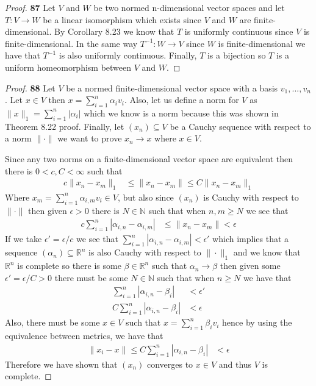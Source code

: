 \documentclass[11pt]{article}
\newcommand{\N}{\mathbb{N}}
\newcommand{\R}{\mathbb{R}}
\theoremstyle{definition}
\begin{document}
    \cleardoublepage
    \begin{proof}{\textbf{87}}
        Let $V$ and $W$ be two normed n-dimensional vector spaces and let
        $T:V \to W$ be a linear isomorphism which exists since $V$ and $W$
        are finite-dimensional. By Corollary 8.23 we know that
        $T$ is uniformly continuous since $V$ is finite-dimensional.
        In the same way $T^{-1}:W \to V$ since $W$ is finite-dimensional we
        have that $T^{-1}$ is also uniformly continuous.
        Finally, $T$ is a bijection so $T$ is a uniform homeomorphism
        between $V$ and $W$.
    \end{proof}
    \begin{proof}{\textbf{88}}
        Let $V$ be a normed finite-dimensional vector space with a basis
        $v_1,..., v_n$. Let $x \in V$ then $x = \sum_{i=1}^n \alpha_i v_i$.
        Also, let us define a norm for $V$ as
        $\|x\|_1 = \sum_{i=1}^{n}|\alpha_i|$ which we know is a norm because
        this was shown in Theorem 8.22 proof.
        Finally, let $(x_n) \subseteq V$ be a Cauchy sequence with respect to
        a norm $\|\cdot\|$ we want to prove $x_n \to x$ where $x \in V$.

        Since any two norms on a finite-dimensional vector space are equivalent
        then there is $0< c,C < \infty$ such that
        \begin{align*}
            c\|x_n - x_m\|_1 &\leq \|x_n - x_m\| \leq C\|x_n - x_m\|_1
        \end{align*}
        Where $x_m = \sum_{i=1}^n \alpha_{i,m} v_i \in V$,
        but also since $(x_n)$ is Cauchy with
        respect to $\|\cdot\|$ then given $\epsilon > 0$ there is $N \in \N$
        such that when $n, m \geq N$ we see that
        \begin{align*}
            c\sum_{i=1}^n |\alpha_{i,n} - \alpha_{i,m}|
            &\leq \|x_n - x_m\| < \epsilon
        \end{align*}
        If we take $\epsilon' = \epsilon /c$ we see that
        $\sum_{i=1}^n |\alpha_{i,n} - \alpha_{i,m}| < \epsilon'$ which implies that
        a sequence $(\alpha_n) \subseteq \R^n$ is also Cauchy with respect to
        $\|\cdot\|_1$ and we know that $\R^n$ is complete so there is some
        $\beta \in \R^n$ such that $\alpha_n \to \beta$ then
        given some $\epsilon' = \epsilon /C > 0$ there must be some $N \in \N$
        such that when $n \geq N$ we have that
        \begin{align*}
            \sum_{i=1}^n |\alpha_{i,n} - \beta_{i}| &< \epsilon'\\
            C\sum_{i=1}^n |\alpha_{i,n} - \beta_{i}| &< \epsilon
        \end{align*}
        Also, there must be some $x \in V$ such that $x = \sum_{i=1}^n \beta_i v_i$
        hence by using the equivalence between metrics, we have that 
        \begin{align*}
            \|x_i - x\| \leq C\sum_{i=1}^n |\alpha_{i,n} - \beta_{i}| &< \epsilon
        \end{align*}
        Therefore we have shown that $(x_n)$ converges to $x \in V$ and thus
        $V$ is complete.
    \end{proof}
\end{document}
